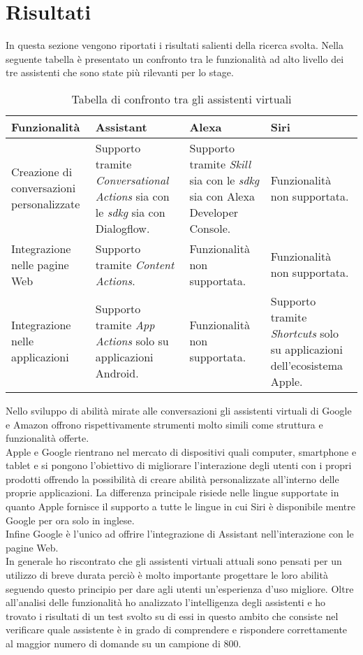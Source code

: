 \section{Risultati}
In questa sezione vengono riportati i risultati salienti della ricerca svolta. Nella seguente tabella è presentato un confronto tra le funzionalità ad alto livello dei tre assistenti che sono state più rilevanti per lo stage.
\begin{table}
	\begin{tabularx}{\textwidth}{|X|X|X|X|}
		\hline
		\textbf{Funzionalità} & \textbf{Assistant} & \textbf{Alexa} & \textbf{Siri} \\\hline
		
		Creazione di conversazioni personalizzate & Supporto tramite \emph{Conversational Actions} sia con le \emph{\gls{sdkg}} sia con Dialogflow.  & Supporto tramite \emph{Skill} sia con le \emph{\gls{sdkg}} sia con Alexa Developer Console. & Funzionalità non supportata. \\
		\hline
		Integrazione nelle pagine Web & Supporto tramite \emph{Content Actions}. & Funzionalità non supportata. & Funzionalità non supportata. \\
		\hline
		Integrazione nelle applicazioni & Supporto tramite \emph{App Actions} solo su applicazioni Android. & Funzionalità non supportata. & Supporto tramite \emph{Shortcuts} solo su applicazioni dell'ecosistema Apple. \\
		\hline
	\end{tabularx}
	\caption{Tabella di confronto tra gli assistenti virtuali}
\end{table}
Nello sviluppo di abilità mirate alle conversazioni gli assistenti virtuali di Google e Amazon offrono rispettivamente strumenti molto simili come struttura e funzionalità offerte. \\
Apple e Google rientrano nel mercato di dispositivi quali computer, smartphone e tablet e si pongono l'obiettivo di migliorare l’interazione degli utenti con i propri prodotti offrendo la possibilità di creare abilità personalizzate all'interno delle proprie applicazioni. La differenza principale risiede nelle lingue supportate in quanto Apple fornisce il supporto a tutte le lingue in cui Siri è disponibile mentre Google per ora solo in inglese. \\
Infine Google è l'unico ad offrire l'integrazione di Assistant nell'interazione con le pagine Web. \\
In generale ho riscontrato che gli assistenti virtuali attuali sono pensati per un utilizzo di breve durata perciò è molto importante progettare le loro abilità seguendo questo principio per dare agli utenti un'esperienza d'uso migliore.
Oltre all'analisi delle funzionalità ho analizzato l'intelligenza degli assistenti e ho trovato i risultati di un test svolto su di essi in questo ambito che consiste nel verificare quale assistente è in grado di comprendere e rispondere correttamente al maggior numero di domande su un campione di 800.

